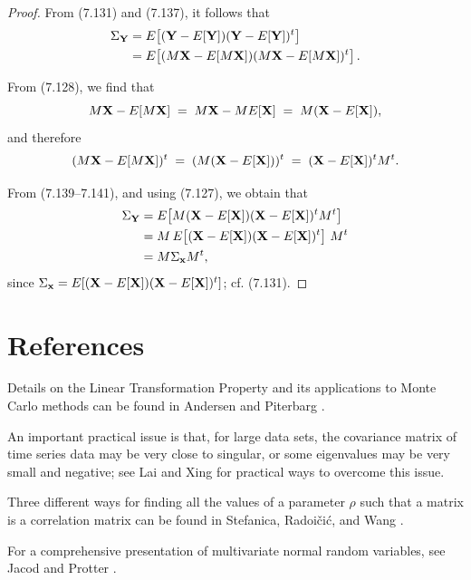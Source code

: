 \begin{proof}
From (7.131) and (7.137), it follows that
\begin{align}
\Sigma_{\mathbf{Y}} &= E\!\left[(\mathbf{Y}-E\!\left[\mathbf{Y}\right])(\mathbf{Y}-E\!\left[\mathbf{Y}\right])^t\right] \notag \\
&= E\!\left[(M\mathbf{X} - E\!\left[M\mathbf{X}\right])(M\mathbf{X}-E\!\left[M\mathbf{X}\right])^t\right].
\end{align}

From (7.128), we find that
\begin{equation}
M\mathbf{X} - E\!\left[M\mathbf{X}\right] \;=\; M\mathbf{X} - ME\!\left[\mathbf{X}\right] \;=\; M(\mathbf{X}-E\!\left[\mathbf{X}\right]),
\end{equation}
and therefore
\begin{equation}
(M\mathbf{X}-E\!\left[M\mathbf{X}\right])^t \;=\; (M(\mathbf{X}-E\!\left[\mathbf{X}\right]))^t \;=\; (\mathbf{X}-E\!\left[\mathbf{X}\right])^tM^t.
\end{equation}

From (7.139--7.141), and using (7.127), we obtain that
\begin{align*}
\Sigma_{\mathbf{Y}} &= E\!\left[M(\mathbf{X}-E\!\left[\mathbf{X}\right])(\mathbf{X}-E\!\left[\mathbf{X}\right])^tM^t\right] \\
&= M\,E\!\left[(\mathbf{X}-E\!\left[\mathbf{X}\right])(\mathbf{X}-E\!\left[\mathbf{X}\right])^t\right]\,M^t \\
&= M\Sigma_{\mathbf{x}}M^t,
\end{align*}
since $\Sigma_{\mathbf{x}} = E\!\left[(\mathbf{X}-E\!\left[\mathbf{X}\right])(\mathbf{X}-E\!\left[\mathbf{X}\right])^t\right]$; cf. (7.131).
\end{proof}

\section{References}

Details on the Linear Transformation Property and its applications to Monte Carlo
methods can be found in Andersen and Piterbarg \cite{3}.

An important practical issue is that, for large data sets, the covariance matrix of
time series data may be very close to singular, or some eigenvalues may be very small
and negative; see Lai and Xing \cite{25} for practical ways to overcome this issue.

Three different ways for finding all the values of a parameter $\rho$ such that a
matrix is a correlation matrix can be found in Stefanica, Radoi\v{c}i\'{c}, and Wang
\cite{39}.

For a comprehensive presentation of multivariate normal random variables, see Jacod and
Protter \cite{24}.

